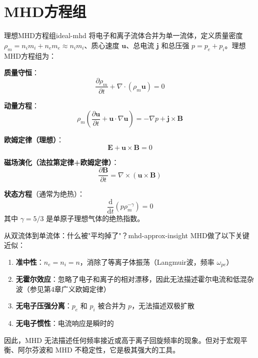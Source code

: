 \documentclass[12pt,a4paper,openany,oneside]{book}
\newcommand{\diff}{\mathrm{d}}
\newcommand{\vect}[1]{\bm{#1}}
\newcommand{\grad}{\nabla}
\newcommand{\curl}{\nabla\times}
\newcommand{\divg}{\nabla\cdot}
\newcommand{\difficulty}[1]{\marginnote{\hfill\textcolor{coverMid!80}{\rule[-0.1em]{2pt}{0.9em}}\,\textcolor{coverMid}{\footnotesize\textbf{[#1]}}}}
\begin{document}
\section{MHD方程组}\difficulty{基础}

\begin{theorem}{理想MHD方程组}{ideal-mhd}
将电子和离子流体合并为单一流体，定义质量密度 $\rho_m = n_i m_i + n_e m_e \approx n_i m_i$、质心速度 $\vect{u}$、总电流 $\vect{j}$ 和总压强 $p = p_e + p_i$。理想MHD方程组为：

\textbf{质量守恒}：
\[
\frac{\partial\rho_m}{\partial t} + \divg(\rho_m\vect{u}) = 0
\]

\textbf{动量方程}：
\[
\rho_m\left(\frac{\partial\vect{u}}{\partial t} + \vect{u}\cdot\grad\vect{u}\right) = -\grad p + \vect{j}\times\vect{B}
\]

\textbf{欧姆定律（理想）}：
\[
\vect{E} + \vect{u}\times\vect{B} = 0
\]

\textbf{磁场演化（法拉第定律+欧姆定律）}：
\[
\frac{\partial\vect{B}}{\partial t} = \curl(\vect{u}\times\vect{B})
\]

\textbf{状态方程}（通常为绝热）：
\[
\frac{\diff}{\diff t}(p\rho_m^{-\gamma}) = 0
\]
其中 $\gamma = 5/3$ 是单原子理想气体的绝热指数。
\end{theorem}

\begin{insight}{从双流体到单流体：什么被"平均掉了"？}{mhd-approx-insight}
MHD做了以下关键近似：
\begin{enumerate}
\item \textbf{准中性}：$n_e = n_i = n$，消除了等离子体振荡（Langmuir波，频率 $\omega_{pe}$）
\item \textbf{无霍尔效应}：忽略了电子和离子的相对漂移，因此无法描述霍尔电流和低混杂波（参见第4章广义欧姆定律）
\item \textbf{无电子压强分离}：$p_e$ 和 $p_i$ 被合并为 $p$，无法描述双极扩散
\item \textbf{无电子惯性}：电流响应是瞬时的
\end{enumerate}
因此，MHD 无法描述任何频率接近或高于离子回旋频率的现象。但对于宏观平衡、阿尔芬波和 MHD 不稳定性，它是极其强大的工具。
\end{insight}
\end{document}
